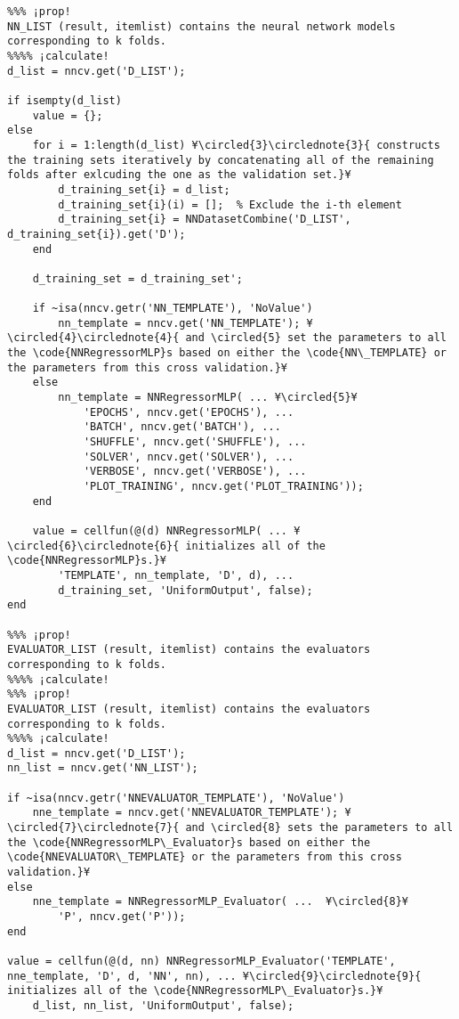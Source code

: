 \documentclass{tufte-handout}
\begin{document}
\begin{lstlisting}
%%% ¡prop!
NN_LIST (result, itemlist) contains the neural network models corresponding to k folds.
%%%% ¡calculate!
d_list = nncv.get('D_LIST');

if isempty(d_list)
    value = {};
else
    for i = 1:length(d_list) ¥\circled{3}\circlednote{3}{ constructs the training sets iteratively by concatenating all of the remaining folds after exlcuding the one as the validation set.}¥
        d_training_set{i} = d_list;
        d_training_set{i}(i) = [];  % Exclude the i-th element
        d_training_set{i} = NNDatasetCombine('D_LIST', d_training_set{i}).get('D');
    end

    d_training_set = d_training_set';

    if ~isa(nncv.getr('NN_TEMPLATE'), 'NoValue')
        nn_template = nncv.get('NN_TEMPLATE'); ¥\circled{4}\circlednote{4}{ and \circled{5} set the parameters to all the \code{NNRegressorMLP}s based on either the \code{NN\_TEMPLATE} or the parameters from this cross validation.}¥
    else
        nn_template = NNRegressorMLP( ... ¥\circled{5}¥
            'EPOCHS', nncv.get('EPOCHS'), ...
            'BATCH', nncv.get('BATCH'), ...
            'SHUFFLE', nncv.get('SHUFFLE'), ...
            'SOLVER', nncv.get('SOLVER'), ...
            'VERBOSE', nncv.get('VERBOSE'), ...
            'PLOT_TRAINING', nncv.get('PLOT_TRAINING'));
    end
    
    value = cellfun(@(d) NNRegressorMLP( ... ¥\circled{6}\circlednote{6}{ initializes all of the \code{NNRegressorMLP}s.}¥
        'TEMPLATE', nn_template, 'D', d), ...
        d_training_set, 'UniformOutput', false);
end

%%% ¡prop!
EVALUATOR_LIST (result, itemlist) contains the evaluators corresponding to k folds.
%%%% ¡calculate!
%%% ¡prop!
EVALUATOR_LIST (result, itemlist) contains the evaluators corresponding to k folds.
%%%% ¡calculate!
d_list = nncv.get('D_LIST');
nn_list = nncv.get('NN_LIST');

if ~isa(nncv.getr('NNEVALUATOR_TEMPLATE'), 'NoValue')
    nne_template = nncv.get('NNEVALUATOR_TEMPLATE'); ¥\circled{7}\circlednote{7}{ and \circled{8} sets the parameters to all the \code{NNRegressorMLP\_Evaluator}s based on either the \code{NNEVALUATOR\_TEMPLATE} or the parameters from this cross validation.}¥
else
    nne_template = NNRegressorMLP_Evaluator( ...  ¥\circled{8}¥
        'P', nncv.get('P'));
end

value = cellfun(@(d, nn) NNRegressorMLP_Evaluator('TEMPLATE', nne_template, 'D', d, 'NN', nn), ... ¥\circled{9}\circlednote{9}{ initializes all of the \code{NNRegressorMLP\_Evaluator}s.}¥
    d_list, nn_list, 'UniformOutput', false);

\end{lstlisting}
\end{document}
